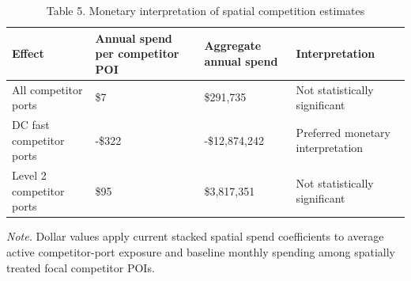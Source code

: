 \begin{table}[!htbp]
\centering
\caption{Table 5. Monetary interpretation of spatial competition estimates}
\begin{tabular}{llll}
\toprule
Effect & Annual spend per competitor POI & Aggregate annual spend & Interpretation \\
\midrule
All competitor ports & \$7 & \$291,735 & Not statistically significant \\
DC fast competitor ports & -\$322 & -\$12,874,242 & Preferred monetary interpretation \\
Level 2 competitor ports & \$95 & \$3,817,351 & Not statistically significant \\
\bottomrule
\end{tabular}
\begin{minipage}{0.95\linewidth}\footnotesize\emph{Note.} Dollar values apply current stacked spatial spend coefficients to average active competitor-port exposure and baseline monthly spending among spatially treated focal competitor POIs.\end{minipage}
\end{table}
